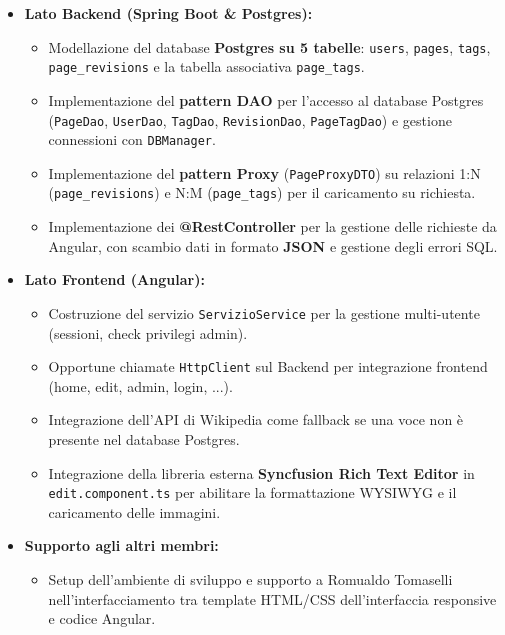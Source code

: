 \documentclass[11pt,a4paper]{article}
\begin{document}
\begin{itemize}
    \item \textbf{Lato Backend (Spring Boot \& Postgres):}
    \begin{itemize}
        \item Modellazione del database \textbf{Postgres su 5 tabelle}: \texttt{users}, \texttt{pages}, \texttt{tags}, \texttt{page\_revisions} e la tabella associativa \texttt{page\_tags}.
        \item Implementazione del \textbf{pattern DAO} per l'accesso al database Postgres (\texttt{PageDao}, \texttt{UserDao}, \texttt{TagDao}, \texttt{RevisionDao}, \texttt{PageTagDao}) e gestione connessioni con \texttt{DBManager}.
        \item Implementazione del \textbf{pattern Proxy} (\texttt{PageProxyDTO}) su relazioni 1:N (\texttt{page\_revisions}) e N:M (\texttt{page\_tags}) per il caricamento su richiesta.
        \item Implementazione dei \textbf{@RestController} per la gestione delle richieste da Angular, con scambio dati in formato \textbf{JSON} e gestione degli errori SQL.
    \end{itemize}
    \item \textbf{Lato Frontend (Angular):}
    \begin{itemize}
        \item Costruzione del servizio \texttt{ServizioService} per la gestione multi-utente (sessioni, check privilegi admin).
        \item Opportune chiamate \texttt{HttpClient} sul Backend per integrazione frontend (home, edit, admin, login, ...).
        \item Integrazione dell'API di Wikipedia come fallback se una voce non è presente nel database Postgres.
        \item Integrazione della libreria esterna \textbf{Syncfusion Rich Text Editor} in \texttt{edit.component.ts} per abilitare la formattazione WYSIWYG e il caricamento delle immagini.
    \end{itemize}
    \item \textbf{Supporto agli altri membri:}
    \begin{itemize}
        \item Setup dell'ambiente di sviluppo e supporto a Romualdo Tomaselli nell'interfacciamento tra template HTML/CSS dell'interfaccia responsive e codice Angular.
    \end{itemize}
\end{itemize}
\end{document}
